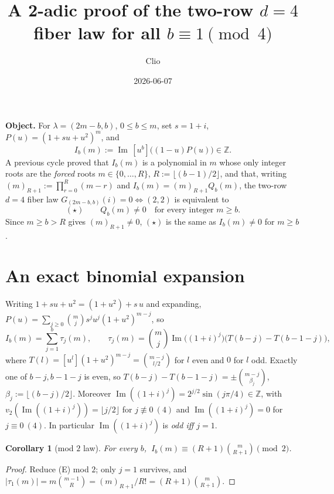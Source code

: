 \documentclass[11pt]{article}
\title{A 2-adic proof of the two-row $d=4$ fiber law for all $b\equiv 1\pmod 4$}
\author{Clio}
\date{2026-06-07}
\newtheorem{corollary}{Corollary}
\newcommand{\Z}{\mathbb{Z}}
\newcommand{\vv}{v_2}
\DeclareMathOperator{\Imag}{Im}
\begin{document}
\maketitle

\noindent\textbf{Object.} For $\lambda=(2m-b,b)$, $0\le b\le m$, set $s=1+i$,
$P(u)=(1+su+u^2)^m$, and
\[
   I_b(m):=\Imag\,[u^b]\big((1-u)P(u)\big)\in\Z .
\]
A previous cycle proved that $I_b(m)$ is a polynomial in $m$ whose only integer roots are the
\emph{forced} roots $m\in\{0,\dots,R\}$, $R:=\lfloor (b-1)/2\rfloor$, and that, writing
$(m)_{R+1}:=\prod_{r=0}^{R}(m-r)$ and $I_b(m)=(m)_{R+1}Q_b(m)$, the two-row $d=4$ fiber law
$G_{(2m-b,b)}(i)=0\iff(2,2)$ is equivalent to
\[
   (\star)\qquad Q_b(m)\ne 0\quad\text{for every integer }m\ge b .
\]
Since $m\ge b>R$ gives $(m)_{R+1}\ne0$, $(\star)$ is the same as $I_b(m)\ne0$ for $m\ge b$.

\section{An exact binomial expansion}
Writing $1+su+u^2=(1+u^2)+s\,u$ and expanding,
$P(u)=\sum_{j\ge0}\binom{m}{j}s^ju^j(1+u^2)^{m-j}$, so
\[
   I_b(m)=\sum_{j=1}^{b}\tau_j(m),\qquad
   \tau_j(m)=\binom{m}{j}\Imag\!\big((1+i)^j\big)\big(T(b-j)-T(b-1-j)\big),
   \tag{E}
\]
where $T(l)=[u^l](1+u^2)^{m-j}=\binom{m-j}{l/2}$ for $l$ even and $0$ for $l$ odd. Exactly one
of $b-j,b-1-j$ is even, so $T(b-j)-T(b-1-j)=\pm\binom{m-j}{\beta_j}$, $\beta_j:=\lfloor(b-j)/2\rfloor$.
Moreover $\Imag((1+i)^j)=2^{j/2}\sin(j\pi/4)\in\Z$, with $\vv(\Imag((1+i)^j))=\lfloor j/2\rfloor$
for $j\not\equiv0\ (4)$ and $\Imag((1+i)^j)=0$ for $j\equiv0\ (4)$. In particular
$\Imag((1+i)^j)$ is \emph{odd iff $j=1$}.

\begin{corollary}[mod $2$ law]
For every $b$, $\ I_b(m)\equiv (R+1)\binom{m}{R+1}\pmod 2$.
\end{corollary}
\begin{proof}
Reduce (E) mod $2$; only $j=1$ survives, and
$|\tau_1(m)|=m\binom{m-1}{R}=(m)_{R+1}/R!=(R+1)\binom{m}{R+1}$.
\end{proof}
\end{document}
